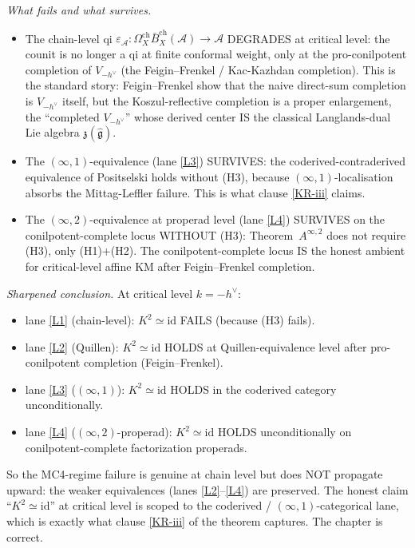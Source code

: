 \documentclass[11pt]{article}
\theoremstyle{definition}
\newcommand{\Bbarch}{\bar B^{\mathrm{ch}}}
\newcommand{\Omegach}{\Omega^{\mathrm{ch}}}
\newcommand{\id}{\mathrm{id}}
\newcommand{\cA}{\mathcal{A}}
\begin{document}
\emph{What fails and what survives.}
\begin{itemize}
\item The chain-level qi $\varepsilon_\cA\colon\Omegach_X\Bbarch_X(\cA)\to\cA$
DEGRADES at critical level: the counit is no longer a qi at finite
conformal weight, only at the pro-conilpotent completion of
$V_{-h^\vee}$ (the Feigin--Frenkel / Kac-Kazhdan completion). This is
the standard story: Feigin--Frenkel \cite{FF92} show that the
naive direct-sum completion is $V_{-h^\vee}$ itself, but the
Koszul-reflective completion is a proper enlargement, the
``completed $V_{-h^\vee}$'' whose derived center IS the classical
Langlands-dual Lie algebra $\mathfrak{z}(\widehat{\mathfrak{g}})$.
\item The $(\infty,1)$-equivalence (lane \ref{L3}) SURVIVES: the
coderived-contraderived equivalence of Positselski \cite{Positselski2011}
holds without (H3), because $(\infty,1)$-localisation absorbs the
Mittag-Leffler failure. This is what clause \ref{KR-iii} claims.
\item The $(\infty,2)$-equivalence at properad level (lane \ref{L4})
SURVIVES on the conilpotent-complete locus WITHOUT (H3): Theorem~$A^{\infty,2}$
does not require (H3), only (H1)+(H2). The conilpotent-complete
locus IS the honest ambient for critical-level affine KM after
Feigin--Frenkel completion.
\end{itemize}

\emph{Sharpened conclusion.} At critical level $k=-h^\vee$:
\begin{itemize}
\item lane \ref{L1} (chain-level): $K^{2}\simeq\id$ FAILS (because
(H3) fails).
\item lane \ref{L2} (Quillen): $K^{2}\simeq\id$ HOLDS at Quillen-equivalence
level after pro-conilpotent completion (Feigin--Frenkel).
\item lane \ref{L3} ($(\infty,1)$): $K^{2}\simeq\id$ HOLDS in the
coderived category unconditionally.
\item lane \ref{L4} ($(\infty,2)$-properad): $K^{2}\simeq\id$ HOLDS
unconditionally on conilpotent-complete factorization properads.
\end{itemize}

So the MC4-regime failure is genuine at chain level but does NOT
propagate upward: the weaker equivalences (lanes \ref{L2}--\ref{L4})
are preserved. The honest claim ``$K^{2}\simeq\id$'' at critical
level is scoped to the coderived / $(\infty,1)$-categorical lane,
which is exactly what clause \ref{KR-iii} of the theorem captures.
The chapter is correct.
\end{document}
